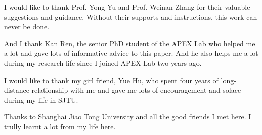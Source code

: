 \begin{thanks}
I would like to thank Prof. Yong Yu and Prof. Weinan Zhang for their valuable 
suggestions and guidance. Without their supports and instructions, this work can never be done.

And I thank Kan Ren, the senior PhD student of the APEX Lab who helped me a lot and gave lots of 
informative advice to this paper. And he also helps me a lot during my research life since I joined APEX Lab two years ago.

I would like to thank my girl friend, Yue Hu, who spent four years of long-distance relationship with me and gave
me lots of encouragement and solace during my life in SJTU.

Thanks to Shanghai Jiao Tong University and all the good friends I met here. I trully learnt a lot from
my life here.
\end{thanks}

